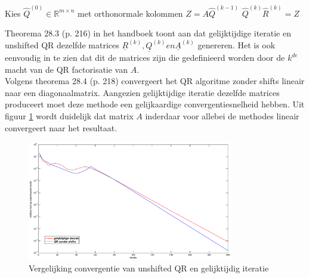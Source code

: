 \documentclass[a4paper, 12pt, titlepage]{report}
\begin{document}
\begin{algorithmic}
 \STATE Kies $\hat{Q}^{(0)}\in \mathbb{R}^{m\times n}$ met orthonormale kolommen
 	\STATE $Z = A\hat{Q}^{(k-1)}$
 	\STATE $\hat{Q}^{(k)}\hat{R}^{(k)} = Z$
 \ENDFOR
\end{algorithmic}

Theorema 28.3 (p. 216) in het handboek toont aan dat gelijktijdige iteratie en unshifted QR dezelfde matrices $\underline{R}^{(k)},\underline{Q}^{(k)} en \underline{A}^{(k)}$ genereren. Het is ook eenvoudig in te zien dat dit de matrices zijn die gedefinieerd worden door de $k^{de}$ macht van de QR factorisatie van $A$.\\

Volgens theorema 28.4 (p. 218) convergeert het QR algoritme zonder shifts lineair naar een diagonaalmatrix. Aangezien gelijktijdige iteratie dezelfde matrices produceert moet deze methode een gelijkaardige convergentiesnelheid hebben. Uit figuur \ref{vglSimQR} wordt duidelijk dat matrix $A$ inderdaar voor allebei de methodes lineair convergeert naar het resultaat.\\

\begin{figure}[htb]
	\centering
	\includegraphics[width=0.8\textwidth]{vergelijkingLineair.eps}
	\caption{Vergelijking convergentie van unshifted QR en gelijktijdig iteratie}
	\label{vglSimQR}
\end{figure}
\end{document}
